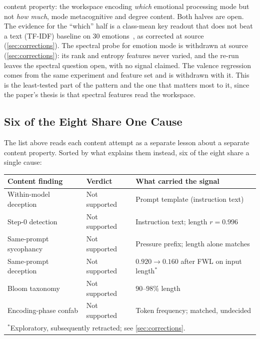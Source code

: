 \documentclass[11pt,a4paper]{article}
\begin{document}
\begin{description}[nosep]
  content property: the workspace encoding \emph{which} emotional
  processing mode but not \emph{how much}, mode metacognitive and degree
  content. Both halves are open. The evidence for the ``which'' half is
  a class-mean key readout that does not beat a text (TF-IDF) baseline
  on 30 emotions~\citep{lyra2026usermodel}, as corrected at source
  (\cref{sec:corrections}). The spectral probe for emotion mode is
  withdrawn at source (\cref{sec:corrections}): its rank and entropy
  features never varied,
  and the re-run leaves the spectral question open, with no signal
  claimed. The valence regression comes from the same experiment and
  feature set and is withdrawn with it. This is the least-tested part of
  the pattern and the one that matters most to it, since the paper's
  thesis is that spectral features read the workspace.
\end{description}

\subsection{Six of the Eight Share One Cause}
\label{sec:one-kill}

The list above reads each content attempt as a separate lesson about a
separate content property. Sorted by what explains them instead, six of
the eight share a single cause:

\begin{center}
\begin{tabular}{lll}
\toprule
\textbf{Content finding} & \textbf{Verdict} & \textbf{What carried the signal} \\
\midrule
Within-model deception & Not supported & Prompt template (instruction text) \\
Step-0 detection & Not supported & Instruction text; length $r{=}0.996$ \\
Same-prompt sycophancy & Not supported & Pressure prefix; length alone matches \\
Same-prompt deception & Not supported & $0.920 \to 0.160$ after FWL on input length$^{*}$ \\
Bloom taxonomy & Not supported & $90$--$98\%$ length \\
Encoding-phase confab & Not supported & Token frequency; matched, undecided \\
\bottomrule
\multicolumn{3}{l}{\footnotesize $^{*}$Exploratory, subsequently retracted; see \cref{sec:corrections}.}
\end{tabular}
\end{center}
\end{document}
